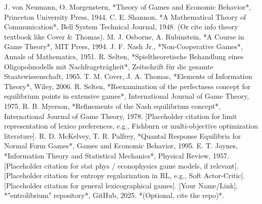 \documentclass{article}
\begin{document}
\begin{thebibliography}{9}
 J. von Neumann, O. Morgenstern, *Theory of Games and Economic Behavior*, Princeton University Press, 1944.
 C. E. Shannon, *A Mathematical Theory of Communication*, Bell System Technical Journal, 1948. (Or cite info theory textbook like Cover & Thomas).
 M. J. Osborne, A. Rubinstein, *A Course in Game Theory*, MIT Press, 1994.
 J. F. Nash Jr., *Non-Cooperative Games*, Annals of Mathematics, 1951.
 R. Selten, *Spieltheoretische Behandlung eines Oligopolmodells mit Nachfrageträgheit*, Zeitschrift für die gesamte Staatswissenschaft, 1965.
 T. M. Cover, J. A. Thomas, *Elements of Information Theory*, Wiley, 2006.
 R. Selten, *Reexamination of the perfectness concept for equilibrium points in extensive games*, International Journal of Game Theory, 1975.
 R. B. Myerson, *Refinements of the Nash equilibrium concept*, International Journal of Game Theory, 1978.
 [Placeholder citation for limit representation of lexico preferences, e.g., Fishburn or multi-objective optimization literature].
 R. D. McKelvey, T. R. Palfrey, *Quantal Response Equilibria for Normal Form Games*, Games and Economic Behavior, 1995.
 E. T. Jaynes, *Information Theory and Statistical Mechanics*, Physical Review, 1957.
 [Placeholder citation for stat phys / econophysics game models, if relevant].
 [Placeholder citation for entropy regularization in RL, e.g., Soft Actor-Critic].
 [Placeholder citation for general lexicographical games].
 [Your Name/Link], *"entrolibrium" repository*, GitHub, 2025. *(Optional, cite the repo)*.
\end{thebibliography}


\end{document}
